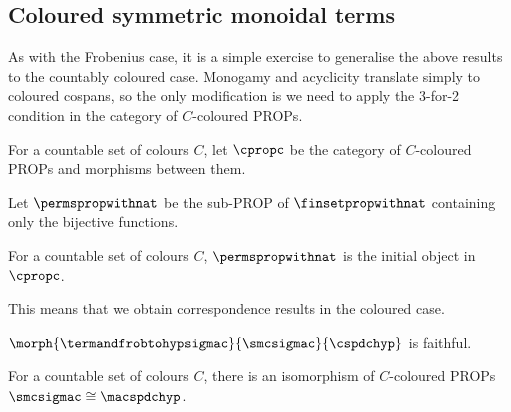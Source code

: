 \subsection{Coloured symmetric monoidal terms}

As with the Frobenius case, it is a simple exercise to generalise the above
results to the countably coloured case.
Monogamy and acyclicity translate simply to coloured cospans, so the only
modification is we need to apply the 3-for-2 condition in the category of
\(C\)-coloured PROPs.

\begin{definition}
    For a countable set of colours \(C\), let \(\cpropc\) be the category of
    \(C\)-coloured PROPs and morphisms between them.
\end{definition}

\begin{lemma}
    Let \(\permspropwithnat\) be the sub-PROP of \(\finsetpropwithnat\)
    containing only the bijective functions.
\end{lemma}

\begin{lemma}
    For a countable set of colours \(C\), \(\permspropwithnat\) is the initial
    object in \(\cpropc\).
\end{lemma}

This means that we obtain correspondence results in the coloured case.

\begin{proposition}
    \(\morph{\termandfrobtohypsigmac}{\smcsigmac}{\cspdchyp}\) is faithful.
\end{proposition}

\begin{corollary}
    For a countable set of colours \(C\), there is an isomorphism of
    \(C\)-coloured PROPs \(\smcsigmac \cong \macspdchyp\).
\end{corollary}